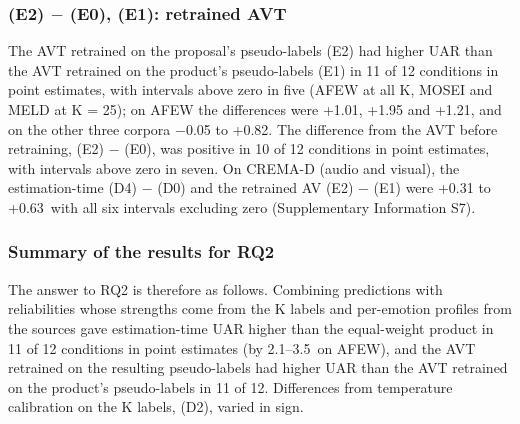 \subsubsection{(E2) $-$ (E0), (E1): retrained AVT}\label{sec:rq2-retrained}
The AVT retrained on the proposal's pseudo-labels (E2) had higher UAR than the AVT retrained on the product's pseudo-labels (E1) in 11 of 12 conditions in point estimates, with intervals above zero in five (AFEW at all K, MOSEI and MELD at K = 25); on AFEW the differences were +1.01, +1.95 and +1.21\pt, and on the other three corpora $-$0.05 to +0.82\pt. The difference from the AVT before retraining, (E2) $-$ (E0), was positive in 10 of 12 conditions in point estimates, with intervals above zero in seven. On CREMA-D (audio and visual), the estimation-time (D4) $-$ (D0) and the retrained AV (E2) $-$ (E1) were +0.31 to +0.63\pt\ with all six intervals excluding zero (Supplementary Information S7).

\subsubsection{Summary of the results for RQ2}
The answer to RQ2 is therefore as follows. Combining predictions with reliabilities whose strengths come from the K labels and per-emotion profiles from the sources gave estimation-time UAR higher than the equal-weight product in 11 of 12 conditions in point estimates (by 2.1--3.5\pt\ on AFEW), and the AVT retrained on the resulting pseudo-labels had higher UAR than the AVT retrained on the product's pseudo-labels in 11 of 12. Differences from temperature calibration on the K labels, (D2), varied in sign.
